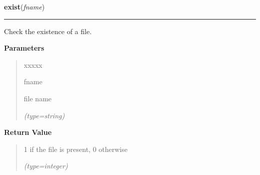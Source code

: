 \hspace{.8\funcindent}\begin{boxedminipage}{\funcwidth}

    \raggedright \textbf{exist}(\textit{fname})

    \vspace{-1.5ex}

    \rule{\textwidth}{0.5\fboxrule}
\setlength{\parskip}{2ex}
    Check the existence of a file.

\setlength{\parskip}{1ex}
      \textbf{Parameters}
      \vspace{-1ex}

      \begin{quote}
        \begin{Ventry}{xxxxx}

          \item[fname]

          file name

            {\it (type=string)}

        \end{Ventry}

      \end{quote}

      \textbf{Return Value}
    \vspace{-1ex}

      \begin{quote}
      1 if the file is present, 0 otherwise

      {\it (type=integer)}

      \end{quote}

    \end{boxedminipage}

    \label{script-BAMmaker:lenGenome}

    \vspace{0.5ex}

